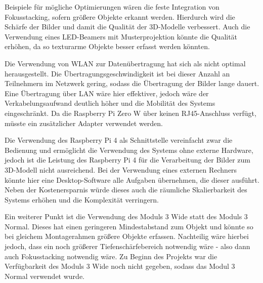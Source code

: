 \documentclass[./00PhotoBox.tex]{subfiles}
\begin{document}
Beispiele für mögliche Optimierungen wären die feste Integration von Fokusstacking, sofern größere Objekte erkannt werden. Hierdurch wird die Schärfe der Bilder und damit die Qualität der 3D-Modelle verbessert. Auch die Verwendung eines LED-Beamers mit Musterprojektion könnte die Qualität erhöhen, da so texturarme Objekte besser erfasst werden könnten.

Die Verwendung von WLAN zur Datenübertragung hat sich als nicht optimal herausgestellt. Die Übertragungsgeschwindigkeit ist bei dieser Anzahl an Teilnehmern im Netzwerk gering, sodass die Übertragung der Bilder lange dauert. Eine Übertragung über LAN wäre hier effektiver, jedoch wäre der Verkabelungsaufwand deutlich höher und die Mobilität des Systems eingeschränkt. Da die Raspberry Pi Zero W über keinen RJ45-Anschluss verfügt, müsste ein zusätzlicher Adapter verwendet werden.

Die Verwendung des Raspberry Pi 4 als Schnittstelle vereinfacht zwar die Bedienung und ermöglicht die Verwendung des Systems ohne externe Hardware, jedoch ist die Leistung des Raspberry Pi 4 für die Verarbeitung der Bilder zum 3D-Modell nicht ausreichend. Bei der Verwendung eines externen Rechners könnte hier eine Desktop-Software alle Aufgaben übernehmen, die dieser ausführt. Neben der Kostenersparnis würde dieses auch die räumliche Skalierbarkeit des Systems erhöhen und die Komplexität verringern.

Ein weiterer Punkt ist die Verwendung des Moduls 3 Wide statt des Moduls 3 Normal. Dieses hat einen geringeren Mindestabstand zum Objekt und könnte so bei gleichem Montagerahmen größere Objekte erfassen. Nachteilig wäre hierbei jedoch, dass ein noch größerer Tiefenschärfebereich notwendig wäre - also dann auch Fokusstacking notwendig wäre. Zu Beginn des Projekts war die Verfügbarkeit des Moduls 3 Wide noch nicht gegeben, sodass das Modul 3 Normal verwendet wurde.




\biblio
\end{document}
